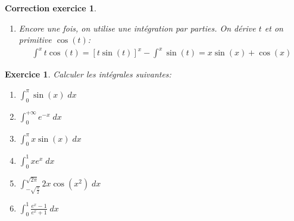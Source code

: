 \documentclass[12pt]{article}
\newtheorem{exercice}{\bf Exercice}
\newtheorem{correction}{\bf Correction exercice}
\newenvironment{exo}{
  \begin{exercice}\normalfont}{\end{exercice}
}
\newenvironment{cor}{
\begin{correction}\smallskip\normalfont}{\end{correction}
}
\begin{document}
\begin{cor}
\begin{enumerate}
\item Encore une fois, on utilise une int\'egration par parties.
  On d\'erive $t$ et on primitive $\cos(t)$:
  \begin{align*}
    \int^x t \cos(t) = [t\sin(t)]^x - \int^x \sin(t)
    = x \sin(x) + \cos(x)
  \end{align*}
\end{enumerate}
\end{cor}
\color{black}
\fi




\begin{exo} Calculer les int\'egrales suivantes:
\begin{multicols}{3}
\begin{enumerate}
\item $\int_0^{\pi} \sin(x) \;dx$
\item $\int_0^{+\infty} e^{-x} \;dx$
\item $\int_0^{\pi} x \sin(x) \;dx$
\item $\int_0^1 x e^x \;dx$
\item $\int_{- \sqrt{\frac{\pi}{2}}}^{\sqrt{2\pi}} 2x \cos(x^2) \;dx$
\item $\int_{0}^1 \frac{e^x - 1}{e^x + 1} \;dx$
\end{enumerate}
\end{multicols}
\end{exo}
\end{document}
